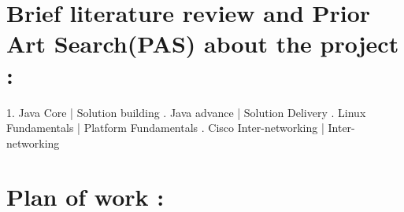 \documentclass[12pt,a4paper,final,oneside]{report}
\begin{document}
	\section{ Brief literature review and Prior Art Search(PAS) about the project :}
	
	\noindent \textbf{}
	
	\noindent\par 1. Java Core | Solution building . Java advance | Solution Delivery . Linux Fundamentals | Platform Fundamentals . Cisco Inter-networking | Inter-networking

\noindent\textbf{} 
	
	\section{Plan of work :}
	
	\noindent 
		
\end{document}
